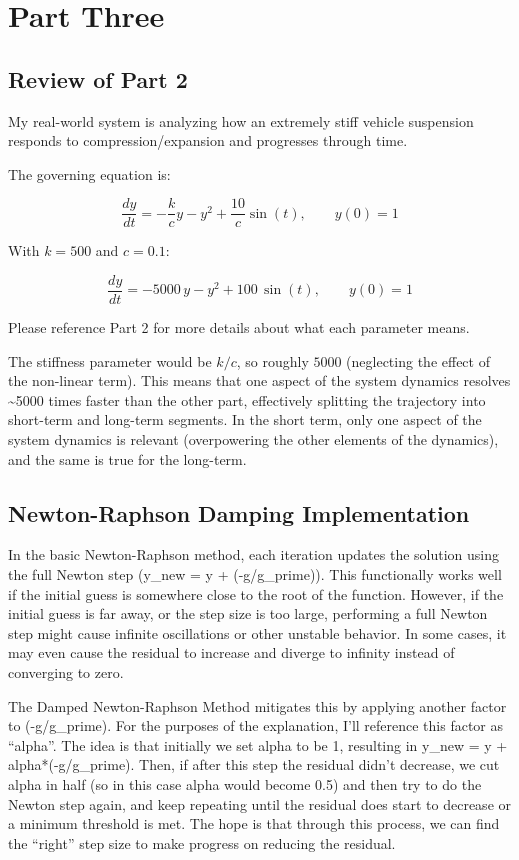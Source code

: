 \documentclass[11pt]{article}
\begin{document}
    \section{Part Three}\label{part-three}

\subsection{Review of Part 2}\label{review-of-part-2}

My real-world system is analyzing how an extremely stiff vehicle
suspension responds to compression/expansion and progresses through
time.

The governing equation is:

\[\frac{dy}{dt} = -\frac{k}{c}y - y^2 + \frac{10}{c}\sin(t), \qquad y(0)=1\]

With \(k=500\) and \(c=0.1\):

\[\frac{dy}{dt} = -5000\,y - y^2 + 100\,\sin(t), \qquad y(0)=1\]

Please reference Part 2 for more details about what each parameter
means.

The stiffness parameter would be \(k/c\), so roughly \(5000\)
(neglecting the effect of the non-linear term). This means that one
aspect of the system dynamics resolves \textasciitilde5000 times faster
than the other part, effectively splitting the trajectory into
short-term and long-term segments. In the short term, only one aspect of
the system dynamics is relevant (overpowering the other elements of the
dynamics), and the same is true for the long-term.

\subsection{Newton-Raphson Damping
Implementation}\label{newton-raphson-damping-implementation}

In the basic Newton-Raphson method, each iteration updates the solution
using the full Newton step (y\_new = y + (-g/g\_prime)). This
functionally works well if the initial guess is somewhere close to the
root of the function. However, if the initial guess is far away, or the
step size is too large, performing a full Newton step might cause
infinite oscillations or other unstable behavior. In some cases, it may
even cause the residual to increase and diverge to infinity instead of
converging to zero.

The Damped Newton-Raphson Method mitigates this by applying another
factor to (-g/g\_prime). For the purposes of the explanation, I'll
reference this factor as ``alpha''. The idea is that initially we set
alpha to be 1, resulting in y\_new = y + alpha*(-g/g\_prime). Then, if
after this step the residual didn't decrease, we cut alpha in half (so
in this case alpha would become 0.5) and then try to do the Newton step
again, and keep repeating until the residual does start to decrease or a
minimum threshold is met. The hope is that through this process, we can
find the ``right'' step size to make progress on reducing the residual.
\end{document}
